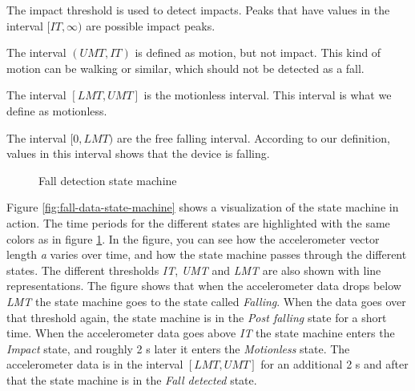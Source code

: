 \documentclass[12pt, a4paper, onecolumn]{article}
\begin{document}
	The impact threshold is used to detect impacts. Peaks that have values in the interval
	\( [IT, \infty) \) are possible impact peaks. 
	
	The interval \( (UMT, IT) \) is defined as motion, but not impact. This kind of motion can be walking or similar, which should not be detected as a fall.
	
	The interval \( [LMT, UMT] \) is the motionless interval. This interval is what we define as motionless.
	
	The interval \( [0, LMT) \) are the free falling interval. According to our definition, values in this interval shows that the device is falling. 
	
	\begin{figure}[H]
		\centering
		\caption{Fall detection state machine}%
		\label{fig:state-machine}%
	\end{figure}
	
	Figure \ref{fig:fall-data-state-machine} shows a visualization of the state machine in action. The time periods for the different states are highlighted with the same colors as in figure \ref{fig:state-machine}. In the figure, you can see how the accelerometer vector length \textit{a} varies over time, and how the state machine passes through the different states. The different thresholds \textit{IT}, \textit{UMT} and \textit{LMT} are also shown with line representations. The figure shows that when the accelerometer data drops below \textit{LMT} the state machine goes to the state called \textit{Falling}. When the data goes over that threshold again, the state machine is in the \textit{Post falling} state for a short time. When the accelerometer data goes above \textit{IT} the state machine enters the \textit{Impact} state, and roughly 2 s later it enters the \textit{Motionless} state. The accelerometer data is in the interval \([LMT, UMT]\) for an additional 2 s and after that the state machine is in the \textit{Fall detected} state.
	
\end{document}
